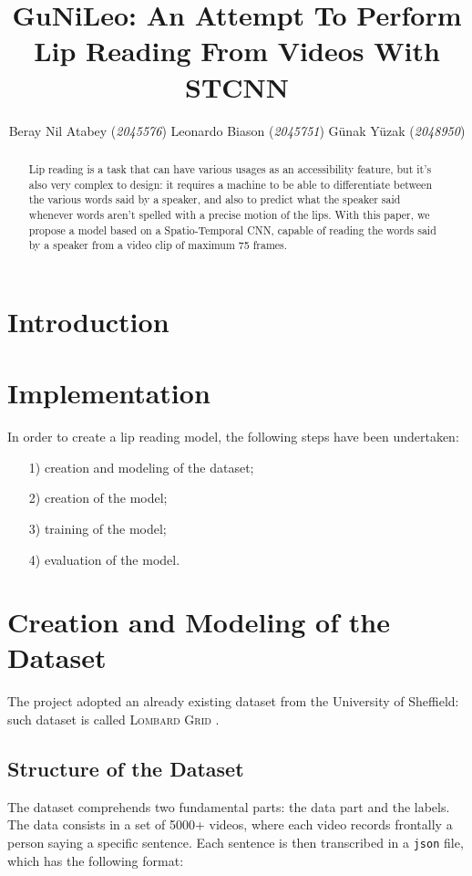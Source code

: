 \documentclass[11pt,journal]{IEEEtran}
\title{GuNiLeo: An Attempt To Perform Lip Reading From Videos With STCNN}
\author{Beray Nil Atabey (\textit{2045576}) \quad Leonardo Biason (\textit{2045751}) \quad Günak Yüzak (\textit{2048950})}
\begin{document}
\maketitle

\begin{abstract}
    Lip reading is a task that can have various usages as an accessibility feature, but it's also very complex to design: it requires a machine to be able to differentiate between the various words said by a speaker, and also to predict what the speaker said whenever words aren't spelled with a precise motion of the lips. With this paper, we propose a model based on a Spatio-Temporal CNN, capable of reading the words said by a speaker from a video clip of maximum 75 frames.
\end{abstract}

\section{Introduction}

\lipsum[1]

\section{Implementation}

In order to create a lip reading model, the following steps have been undertaken:
\begin{itemize}
    \item [1)] creation and modeling of the dataset;
    \item [2)] creation of the model;
    \item [3)] training of the model;
    \item [4)] evaluation of the model.
\end{itemize}

\section{Creation and Modeling of the Dataset}

The project adopted an already existing dataset from the University of Sheffield: such dataset is called \textsc{Lombard Grid} \cite{gunileo:dataset}.

\subsection{Structure of the Dataset}

The dataset comprehends two fundamental parts: the data part and the labels. The data consists in a set of 5000+ videos, where each video records frontally a person saying a specific sentence. Each sentence is then transcribed in a \texttt{json} file, which has the following format:
\end{document}
